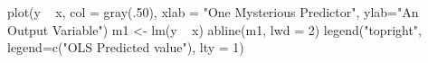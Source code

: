 \begin{Schunk}
\begin{Sinput}
 plot(y ~ x, col = gray(.50), xlab = "One Mysterious Predictor", ylab="An Output Variable")
 m1 <- lm(y ~ x)
 abline(m1, lwd = 2)
 legend("topright", legend=c("OLS Predicted value"), lty = 1)
\end{Sinput}
\end{Schunk}
